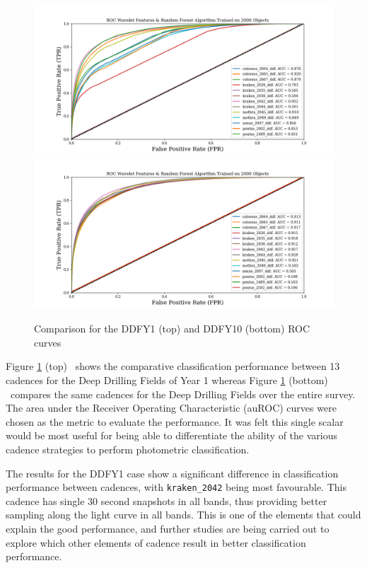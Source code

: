 \documentclass[a4paper,10pt]{article}
\begin{document}
\begin{figure}[htbp]
  \begin{center}
    \includegraphics[width=0.9\linewidth]{photometric_classification_roc_results_ddfY1.png}
    \includegraphics[width=0.9\linewidth]{photometric_classification_roc_results_ddfY10.png}
    \caption{Comparison for the DDFY1 (top) and DDFY10 (bottom) ROC curves}
    \label{fig:rocs}
  \end{center}
\end{figure}


Figure \ref{fig:rocs} (top) ~shows the comparative classification performance between 13 cadences for the Deep
Drilling Fields of Year 1 whereas Figure \ref{fig:rocs} (bottom) ~compares the same
cadences for the Deep Drilling Fields over the entire survey. The area under the Receiver Operating Characteristic (auROC) curves were chosen as the metric
to evaluate the performance. It was felt this single scalar would be most useful
for being able to differentiate the ability of the various cadence strategies
to perform photometric classification.

The results for the DDFY1 case show a significant difference in classification
performance between cadences, with {\tt kraken\_2042} being most favourable.
This cadence has single 30 second snapshots in all bands, thus providing better
sampling along the light curve in all bands. This is one of the elements that could explain
the good performance, and further studies are being carried out to explore which
other elements of cadence result in better classification performance.
\end{document}
